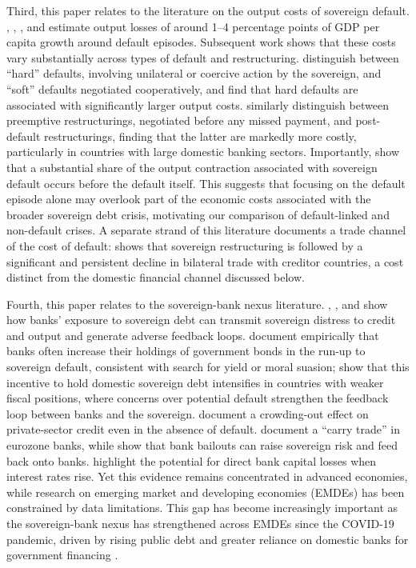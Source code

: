 \documentclass[12pt]{article}
\begin{document}
Third, this paper relates to the literature on the output costs of
sovereign default. \citet{borensztein2009costs}, \citet{furceri2012costly}, \citet{trebesch2017output}, and \citet{kuvshinov2019sovereigns}
estimate output losses of around 1--4 percentage points of GDP per
capita growth around default episodes. Subsequent work shows that these
costs vary substantially across types of default and restructuring.
\citet{trebesch2017output} distinguish between ``hard'' defaults,
involving unilateral or coercive action by the sovereign, and ``soft''
defaults negotiated cooperatively, and find that hard defaults are
associated with significantly larger output costs. \citet{asonuma2024costs} similarly distinguish between preemptive
restructurings, negotiated before any missed payment, and post-default
restructurings, finding that the latter are markedly more costly,
particularly in countries with large domestic banking sectors.
Importantly, \citet{levyyeyati2011elusive} show that a substantial
share of the output contraction associated with sovereign default
occurs before the default itself. This suggests that focusing on the
default episode alone may overlook part of the economic costs
associated with the broader sovereign debt crisis, motivating our
comparison of default-linked and non-default crises. A separate strand
of this literature documents a trade channel of the cost of default:
\citet{rose2005one} shows that sovereign restructuring is followed by a
significant and persistent decline in bilateral trade with creditor
countries, a cost distinct from the domestic financial channel
discussed below.

Fourth, this paper relates to the sovereign-bank nexus literature.
\citet{gennaioli2014sovereign}, \citet{acharya2018real}, and \citet{dellariccia2018managing} show how banks' exposure to sovereign debt
can transmit sovereign distress to credit and output and generate
adverse feedback loops. \citet{gennaioli2018banks} document empirically
that banks often increase their holdings of government bonds in the
run-up to sovereign default, consistent with search for yield or moral
suasion; \citet{angelini2014negative} show that this incentive to hold
domestic sovereign debt intensifies in countries with weaker fiscal
positions, where concerns over potential default strengthen the
feedback loop between banks and the sovereign. \citet{broner2014sovereign} document a
crowding-out effect on private-sector credit even in the absence of
default. \citet{acharya2015greatest} document a ``carry trade'' in
eurozone banks, while \citet{acharya2014pyrrhic} show that bank bailouts
can raise sovereign risk and feed back onto banks. \citet{copestake2023banks} highlight the potential for direct bank capital
losses when interest rates rise. Yet this evidence remains concentrated
in advanced economies, while research on emerging market and developing
economies (EMDEs) has been constrained by data limitations. This gap has
become increasingly important as the sovereign-bank nexus has
strengthened across EMDEs since the COVID-19 pandemic, driven by rising
public debt and greater reliance on domestic banks for government
financing \citep{deghi2022sovereign,wezel2026sovereign}.
\end{document}
